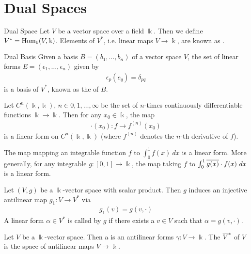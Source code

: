 \section{Dual Spaces}
\begin{importantdefinition}{Dual Space}{}
	Let $V$ be a vector space over a field $\Bbbk$. Then we define $V^* = \textnormal{Hom}_{\Bbbk}(V, \Bbbk)$. Elements of $V^*$, i.e. linear maps $V \to \Bbbk$, are known as .
\end{importantdefinition}
\begin{importanttheorem}{Dual Basis}
	Given a basis $B = (b_1, \hdots, b_n)$ of a vector space $V$, the set of linear forms $E = (\epsilon_1, \hdots, \epsilon_n)$ given by
	\begin{align*}
		\epsilon_p(e_q) = \delta_{pq}
	\end{align*}
	is a basis of $V^*$, known as the  of $B$.
\end{importanttheorem}
\begin{exercise}
	Let $C^n(\Bbbk, \Bbbk)$, $n \in 0, 1, \hdots, \infty$ be the set of $n$-times continuously differentiable functions $\Bbbk \to \Bbbk$. Then for any $x_0 \in \Bbbk$, the map
	\begin{align*}
		\cdot(x_0): f \to f^{(n)}(x_0)
	\end{align*}
	is a linear form on $C^n(\Bbbk, \Bbbk)$ (where $f^{(n)}$ denotes the $n$-th derivative of $f$).
\end{exercise}
\begin{exercise}
	The map mapping an integrable function $f$ to $\int_{0}^1 f(x) ~dx$ is a linear form. More generally, for any integrable $g : [0,1] \to \Bbbk$, the map taking $f$ to $\int_0^1 \overline{{g(x)}} \cdot f(x) ~dx$ is a linear form.
\end{exercise}
\begin{theorem}
	Let $(V,g)$ be a $\Bbbk$-vector space with scalar product. Then $g$ induces an injective antilinear map $g_1 : V \to V^*$ via
	\begin{align*}
		g_1(v) = g(v, \cdot)
	\end{align*}
	A linear form $\alpha \in V^*$ is called  by $g$ if there exists a $v \in V$ such that $\alpha = g(v, \cdot)$.
\end{theorem}
\begin{definition}
	Let $V$ be a $\Bbbk$-vector space. Then a  is an antilinear forms $\gamma: V \to \Bbbk$. The  $\overline{{V}}^*$ of $V$  is the space of antilinear maps $V \to \Bbbk$.
\end{definition}

